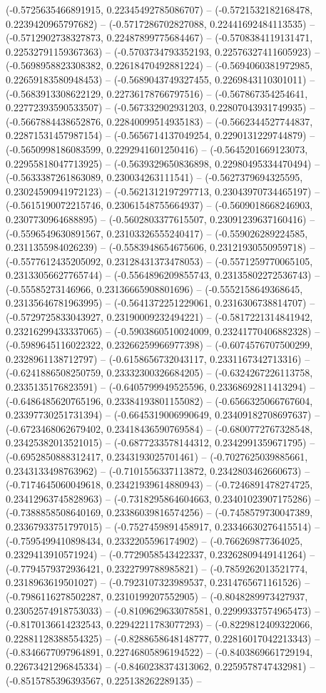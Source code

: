 (-0.5725635466891915, 0.22345492785086707) -- (-0.5721532182168478, 0.2239420965797682) -- (-0.5717286702827088, 0.22441692484113535) -- (-0.5712902738327873, 0.22487899775684467) -- (-0.5708384119131471, 0.22532791159367363) -- (-0.5703734793352193, 0.22576327411605923) -- (-0.5698958823308382, 0.22618470492881224) -- (-0.5694060381972985, 0.22659183580948453) -- (-0.5689043749327455, 0.2269843110301011) -- (-0.5683913308622129, 0.22736178766797516) -- (-0.567867354254641, 0.22772393590533507) -- (-0.567332902931203, 0.22807043931749935) -- (-0.5667884438652876, 0.22840099514935183) -- (-0.5662344527744837, 0.22871531457987154) -- (-0.5656714137049254, 0.2290131229744879) -- (-0.5650998186083599, 0.2292941601250416) -- (-0.5645201669123073, 0.22955818047713925) -- (-0.5639329650836898, 0.22980495334470494) -- (-0.5633387261863089, 0.230034263111541) -- (-0.5627379694325595, 0.23024590941972123) -- (-0.5621312197297713, 0.23043970734465197) -- (-0.5615190072215746, 0.23061548755664937) -- (-0.5609018668246903, 0.2307730964688895) -- (-0.5602803377615507, 0.23091239637160416) -- (-0.5596549630891567, 0.23103326555240417) -- (-0.559026289224585, 0.2311355984026239) -- (-0.5583948654675606, 0.23121930550959718) -- (-0.5577612435205092, 0.23128431373478053) -- (-0.5571259770065105, 0.23133056627765744) -- (-0.5564896209855743, 0.23135802272536743) -- (-0.55585273146966, 0.23136665908801696) -- (-0.5552158649368645, 0.23135646781963995) -- (-0.5641372251229061, 0.2316306738814707) -- (-0.5729725833043927, 0.23190009232494221) -- (-0.5817221314841942, 0.23216299433337065) -- (-0.5903860510024009, 0.23241770406882328) -- (-0.5989645116022322, 0.23266259966977398) -- (-0.6074576707500299, 0.2328961138712797) -- (-0.6158656732043117, 0.2331167342713316) -- (-0.6241886508250759, 0.23332300326684205) -- (-0.6324267226113758, 0.2335135176823591) -- (-0.6405799949525596, 0.23368692811413294) -- (-0.6486485620765196, 0.23384193801155082) -- (-0.6566325066767604, 0.23397730251731394) -- (-0.6645319006990649, 0.23409182708697637) -- (-0.6723468062679402, 0.23418436590769584) -- (-0.6800772767328548, 0.23425382013521015) -- (-0.6877233578144312, 0.2342991359671795) -- (-0.6952850888312417, 0.2343193025701461) -- (-0.7027625039885661, 0.2343133498763962) -- (-0.7101556337113872, 0.2342803462660673) -- (-0.7174645060049618, 0.23421939614880943) -- (-0.7246891478274725, 0.23412963745828963) -- (-0.7318295864604663, 0.23401023907175286) -- (-0.7388858508640169, 0.23386039816574256) -- (-0.7458579730047389, 0.23367933751797015) -- (-0.7527459891458917, 0.23346630276415514) -- (-0.7595499410898434, 0.2332205596174902) -- (-0.766269877364025, 0.2329413910571924) -- (-0.7729058543422337, 0.23262809449141264) -- (-0.7794579372936421, 0.2322799788985821) -- (-0.7859262013521774, 0.2318963619501027) -- (-0.7923107323989537, 0.2314765671161526) -- (-0.7986116278502287, 0.2310199207552905) -- (-0.8048289973427937, 0.23052574918753033) -- (-0.8109629633078581, 0.22999337574965473) -- (-0.8170136614232543, 0.22942211783077293) -- (-0.8229812409322066, 0.22881128388554325) -- (-0.8288658648148777, 0.22816017042213343) -- (-0.8346677097964891, 0.22746805896194522) -- (-0.8403869661729194, 0.22673421296845334) -- (-0.8460238374313062, 0.2259578747432981) -- (-0.8515785396393567, 0.225138262289135) -- 